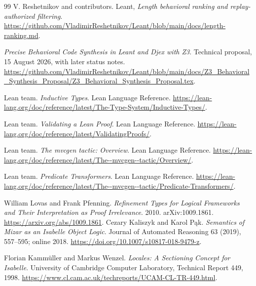 \documentclass[11pt,a4paper]{article}
\theoremstyle{definition}
\begin{document}
\begin{thebibliography}{99}
 V. Reshetnikov and contributors. Leant,
\emph{Length behavioral ranking and replay-authorized filtering}.
\url{https://github.com/VladimirReshetnikov/Leant/blob/main/docs/length-ranking.md}.

 \emph{Precise Behavioral Code Synthesis in Leant and Djex
with Z3}. Technical proposal, 15 August 2026, with later status notes.
\url{https://github.com/VladimirReshetnikov/Leant/blob/main/docs/Z3_Behavioral_Synthesis_Proposal/Z3_Behavioral_Synthesis_Proposal.tex}.

 Lean team. \emph{Inductive Types}. Lean Language Reference.
\url{https://lean-lang.org/doc/reference/latest/The-Type-System/Inductive-Types/}.

 Lean team. \emph{Validating a Lean Proof}. Lean Language Reference.
\url{https://lean-lang.org/doc/reference/latest/ValidatingProofs/}.

 Lean team. \emph{The mvcgen tactic: Overview}. Lean Language Reference.
\url{https://lean-lang.org/doc/reference/latest/The--mvcgen--tactic/Overview/}.

 Lean team. \emph{Predicate Transformers}. Lean Language Reference.
\url{https://lean-lang.org/doc/reference/latest/The--mvcgen--tactic/Predicate-Transformers/}.

 William Lovas and Frank Pfenning.
\emph{Refinement Types for Logical Frameworks and Their Interpretation as Proof
Irrelevance}. 2010. arXiv:1009.1861.
\url{https://arxiv.org/abs/1009.1861}.
 Cezary Kaliszyk and Karol P\k{a}k.
\emph{Semantics of Mizar as an Isabelle Object Logic}.
Journal of Automated Reasoning 63 (2019), 557--595; online 2018.
\url{https://doi.org/10.1007/s10817-018-9479-z}.

 Florian Kamm\"uller and Markus Wenzel.
\emph{Locales: A Sectioning Concept for Isabelle}.
University of Cambridge Computer Laboratory, Technical Report 449, 1998.
\url{https://www.cl.cam.ac.uk/techreports/UCAM-CL-TR-449.html}.
\end{thebibliography}
\end{document}
